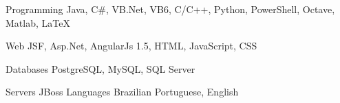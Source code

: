 

\begin{cvskills}

  \cvskill
    {Programming} %
    {Java, C\#, VB.Net, VB6, C/C++, Python, PowerShell, Octave, Matlab, LaTeX} %

  \cvskill
    {Web} %
    {JSF, Asp.Net, AngularJs 1.5, HTML, JavaScript, CSS} %

  \cvskill
    {Databases} %
    {PostgreSQL, MySQL, SQL Server} %
    
  \cvskill
    {Servers} %
    {JBoss} %
  \cvskill
    {Languages} %
    {Brazilian Portuguese, English} %

\end{cvskills}
